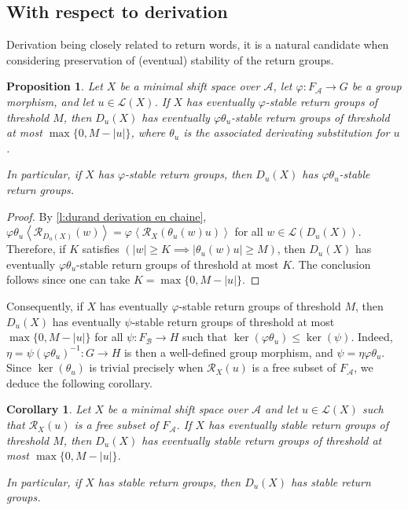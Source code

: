 \documentclass{amsart}
\newcommand*{\ret}{\mathcal{R}}
\newcommand*{\lang}{\mathcal{L}}
\newcommand*{\cA}{\mathcal{A}}
\newcommand*{\cB}{\mathcal{B}}
\newcommand*{\from}{\colon}
\newcommand*{\gen}[1]{\left\langle #1\right\rangle}
\theoremstyle{plain}
\newtheorem{proposition}[theorem]{Proposition}
\newtheorem{corollary}[theorem]{Corollary}
\theoremstyle{definition}
\theoremstyle{remark}
\begin{document}
\subsection{With respect to derivation}

Derivation being closely related to return words, it is a natural candidate when considering preservation of (eventual) stability of the return groups. 

\begin{proposition}\label{P:stable preserved by derivation}
    Let $X$ be a minimal shift space over $\cA$, let $\varphi\from F_\cA \to G$ be a group morphism, and let $u \in \lang(X)$. If $X$ has eventually $\varphi$-stable return groups of threshold $M$, then $D_u(X)$ has eventually $\varphi\theta_u$-stable return groups of threshold at most $\max\{0,M - |u|\}$, where $\theta_u$ is the associated derivating substitution for $u$.

    In particular, if $X$ has $\varphi$-stable return groups, then $D_u(X)$ has $\varphi\theta_u$-stable return groups.
\end{proposition}

\begin{proof}
    By \cref{l:durand derivation en chaine}, $\varphi\theta_u\gen{\ret_{D_u(X)}(w)} = \varphi\gen{\ret_X(\theta_u(w)u)}$ for all $w \in \lang(D_u(X))$. Therefore, if $K$ satisfies $(|w| \geq K \implies |\theta_u(w)u| \geq M)$, then $D_u(X)$ has eventually $\varphi\theta_u$-stable return groups of threshold at most $K$. The conclusion follows since one can take $K = \max\{0,M - |u|\}$.
\end{proof}

Consequently, if $X$ has eventually $\varphi$-stable return groups of threshold $M$, then $D_u(X)$ has eventually $\psi$-stable return groups of threshold at most $\max\{0,M-|u|\}$ for all $\psi\from F_\cB \to H$ such that $\ker(\varphi\theta_u) \leq \ker(\psi)$. Indeed, $\eta = \psi(\varphi\theta_u)^{-1}\from G \to H$ is then a well-defined group morphism, and $\psi = \eta \varphi\theta_u$. Since $\ker(\theta_u)$ is trivial precisely when $\ret_X(u)$ is a free subset of $F_\cA$, we deduce the following corollary.

\begin{corollary} \label{C:universal+free is stable}
    Let $X$ be a minimal shift space over $\cA$ and let $u \in \lang(X)$ such that $\ret_X(u)$ is a free subset of $F_\cA$. If $X$ has eventually stable return groups of threshold $M$, then $D_u(X)$ has eventually stable return groups of threshold at most $\max\{0,M - |u|\}$.

    In particular, if $X$ has stable return groups, then $D_u(X)$ has stable return groups.
\end{corollary}
\end{document}
